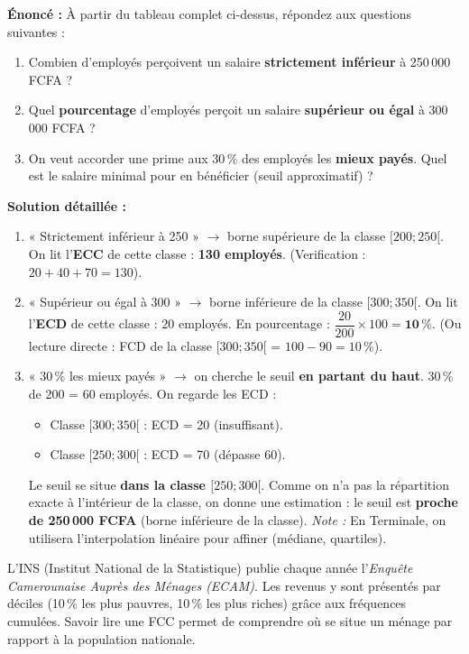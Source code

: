 \documentclass[11pt]{article}
\begin{document}
\begin{exoresolu}
\textbf{Énoncé :} À partir du tableau complet ci-dessus, répondez aux questions suivantes :
\begin{enumerate}
\item Combien d'employés perçoivent un salaire \textbf{strictement inférieur} à 250\,000 FCFA ?
\item Quel \textbf{pourcentage} d'employés perçoit un salaire \textbf{supérieur ou égal} à 300\,000 FCFA ?
\item On veut accorder une prime aux 30\,\% des employés les \textbf{mieux payés}. Quel est le salaire minimal pour en bénéficier (seuil approximatif) ?
\end{enumerate}

\textbf{Solution détaillée :}
\begin{enumerate}
\item « Strictement inférieur à 250 » $\rightarrow$ borne supérieure de la classe $[200;250[$.
On lit l'\textbf{ECC} de cette classe : \textbf{130 employés}.
(Verification : $20+40+70=130$).
\item « Supérieur ou égal à 300 » $\rightarrow$ borne inférieure de la classe $[300;350[$.
On lit l'\textbf{ECD} de cette classe : $20$ employés.
En pourcentage : $\dfrac{20}{200} \times 100 = \mathbf{10\,\%}$.
(Ou lecture directe : FCD de la classe $[300;350[$ = $100 - 90 = 10\,\%$).
\item « 30\,\% les mieux payés » $\rightarrow$ on cherche le seuil \textbf{en partant du haut}.
30\,\% de 200 = 60 employés.
On regarde les ECD : 
\begin{itemize}
\item Classe $[300;350[$ : ECD = 20 (insuffisant).
\item Classe $[250;300[$ : ECD = 70 (dépasse 60).
\end{itemize}
Le seuil se situe \textbf{dans la classe $[250;300[$}.
Comme on n'a pas la répartition exacte à l'intérieur de la classe, on donne une estimation : le seuil est \textbf{proche de 250\,000 FCFA} (borne inférieure de la classe).
\emph{Note :} En Terminale, on utilisera l'interpolation linéaire pour affiner (médiane, quartiles).
\end{enumerate}
\end{exoresolu}

\begin{savaistu}
L'INS (Institut National de la Statistique) publie chaque année l'\emph{Enquête Camerounaise Auprès des Ménages (ECAM)}. Les revenus y sont présentés par déciles (10\,\% les plus pauvres, 10\,\% les plus riches) grâce aux fréquences cumulées. Savoir lire une FCC permet de comprendre où se situe un ménage par rapport à la population nationale.
\end{savaistu}
\end{document}
